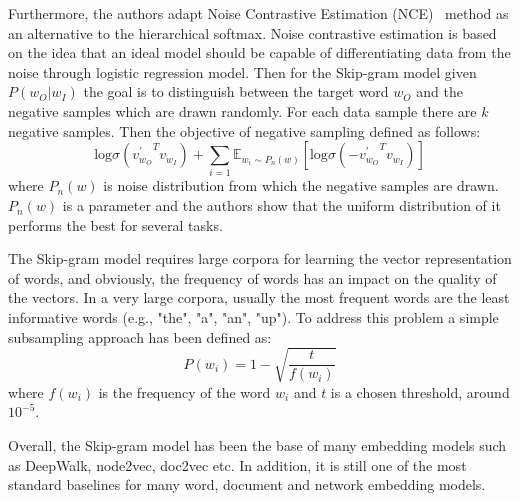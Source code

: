 \begin{itemize}
Furthermore, the authors adapt Noise Contrastive Estimation (NCE)~\cite{cite} method as an alternative to the hierarchical softmax. Noise contrastive estimation is based on the idea that an ideal model should be capable of differentiating data from the noise through logistic regression model. Then for the Skip-gram model given  $P(w_O|w_I)$ the goal is to  distinguish between the target word $w_O$ and the negative samples which are drawn randomly. For each data sample there are $k$ negative samples. Then the objective of negative sampling defined as follows: 
\begin{equation}
 \textrm{log}\sigma({v^{'}_{w_O}}^{T} {v}_{w_{I}} )+ \sum_{i=1 }\mathbb{E}_{w_i\sim P_n(w)}\left[ \textrm{log}\sigma({- v^{'}_{w_O}}^{T} {v}_{w_{I}} ) \right] 
\end{equation}
where $P_n(w)$ is noise distribution from which the negative samples are drawn. $P_n(w)$ is a parameter and the authors show that the uniform distribution of it performs the best for several tasks.

The Skip-gram model requires large corpora for learning the vector representation of words, and obviously, the frequency of words has an impact on the quality of the vectors. In a very large corpora, usually the most frequent words are the least informative words (e.g., "the", "a", "an", "up"). To address this problem a simple subsampling approach has been defined as:
\begin{equation}
P(w_i)=1-\sqrt{\frac{t}{f(w_i)} }
\end{equation}
where $f(w_i)$ is the frequency of the word $w_i$ and $t$ is a chosen threshold, around $10^{-5}$. 

Overall, the Skip-gram model has been the base of many embedding models such as DeepWalk, node2vec, doc2vec etc. In addition, it is still one of the most standard baselines for many word, document and network embedding models.\\




\end{itemize}
